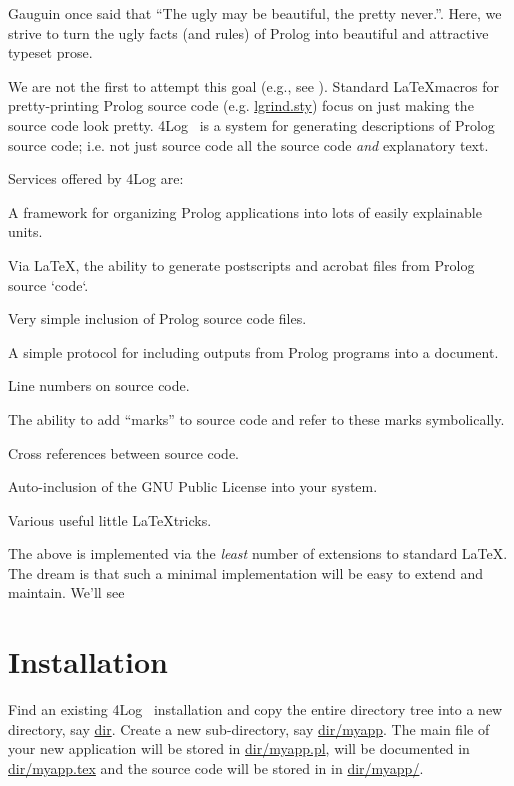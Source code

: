 \documentclass[twocolumn,global]{tex4log/svjour}
\begin{document}
Gauguin once said that ``The ugly may be beautiful,  the pretty
never.''. Here, we strive to turn the ugly facts (and rules) of
Prolog into beautiful and attractive typeset prose.

We are not the first to attempt this goal (e.g., see ).
 Standard \LaTeX macros for pretty-printing Prolog source
code (e.g. \url{lgrind.sty}) focus on just making the source code
look pretty. \Tex4Log~ is a system for generating descriptions of
Prolog source code; i.e. not just source code all the source code
{\em and} explanatory text.

Services offered by \Tex4Log are: \bi \item A framework for
organizing Prolog applications into lots of easily explainable units.
\item Via \LaTeX, the ability to generate postscripts and acrobat
files from Prolog source `code`. \item Very simple inclusion of
Prolog source code files. \item A simple protocol for including
outputs from Prolog programs into a document. \item Line numbers on
source code. \item The ability to add ``marks'' to source code and
refer to these marks symbolically. \item Cross references between
source code. \item Auto-inclusion of the GNU Public License into your
system. \item Various useful little \LaTeX tricks. \ei

The above is implemented via the {\em least} number of extensions to
standard \LaTeX. The dream is that such a minimal implementation will
be easy to extend and maintain. We'll see{\exclaim}

\section{Installation}
Find an existing \Tex4Log~ installation and copy the entire directory
tree into a new directory, say \url{dir}. Create a new sub-directory,
say \url{dir/myapp}. The main file of your new application will be
stored in \url{dir/myapp.pl}, will be documented in
\url{dir/myapp.tex} and the source code will be stored in in
\url{dir/myapp/}.







{\footnotesize }
\end{document}
